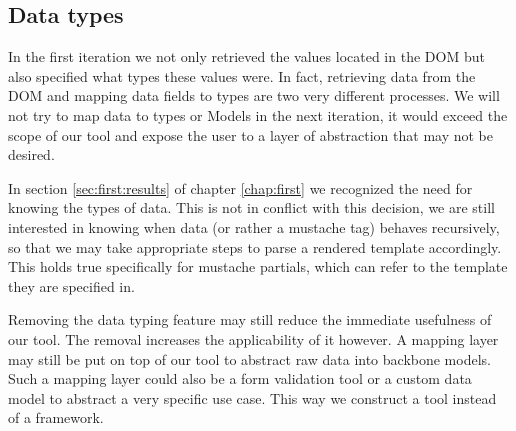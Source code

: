\subsection{Data types}
In the first iteration we not only retrieved the values located in the DOM but
also specified what types these values were. In fact, retrieving data from the
DOM and mapping data fields to types are two very different processes. We will
not try to map data to types or Models in the next iteration, it would exceed
the scope of our tool and expose the user to a layer of abstraction that may not
be desired.

In section \ref{sec:first:results} of chapter \ref{chap:first} we
recognized the need for knowing the types of data.
This is not in conflict with this decision, we are still interested in
knowing when data (or rather a mustache tag) behaves recursively, so that we may
take appropriate steps to parse a rendered template accordingly. This holds true
specifically for mustache partials, which can refer to the template they are
specified in.

Removing the data typing feature may still reduce the immediate usefulness
of our tool. The removal increases the applicability of it however.
A mapping layer may still be put on top of our tool to abstract raw data
into backbone models.
Such a mapping layer could also be a form validation tool or a custom
data model to abstract a very specific use case.
This way we construct a tool instead of a framework.




